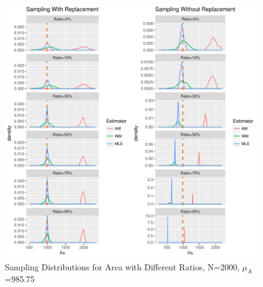 \documentclass{article}\usepackage[]{graphicx}\usepackage[]{color}
\makeatletter
\def\maxwidth{ %
  \ifdim\Gin@nat@width>\linewidth
    \linewidth
  \else
    \Gin@nat@width
  \fi
}
\newenvironment{knitrout}{}{} %
\numberwithin{figure}{subsection} %
\numberwithin{table}{subsection} %
\makeatother
\begin{document}
  
\begin{figure}[!htbp]
  \centering
\begin{knitrout}
\color{fgcolor}
\includegraphics[width=\maxwidth]{figure/unnamed-chunk-3-1} 

\end{knitrout}
  \caption{Sampling Distributions for Area with Different Ratios, N=2000, ${\mu}_{A}$=985.75}
\label{fig_dis_size}
\end{figure}
\end{document}
